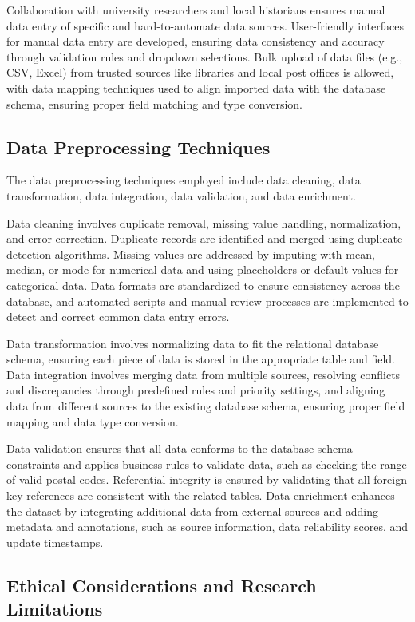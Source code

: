 Collaboration with university researchers and local historians ensures manual data entry of specific and hard-to-automate data sources. User-friendly interfaces for manual data entry are developed, ensuring data consistency and accuracy through validation rules and dropdown selections. Bulk upload of data files (e.g., CSV, Excel) from trusted sources like libraries and local post offices is allowed, with data mapping techniques used to align imported data with the database schema, ensuring proper field matching and type conversion.

\subsection{Data Preprocessing Techniques}

The data preprocessing techniques employed include data cleaning, data transformation, data integration, data validation, and data enrichment.

Data cleaning involves duplicate removal, missing value handling, normalization, and error correction. Duplicate records are identified and merged using duplicate detection algorithms. Missing values are addressed by imputing with mean, median, or mode for numerical data and using placeholders or default values for categorical data. Data formats are standardized to ensure consistency across the database, and automated scripts and manual review processes are implemented to detect and correct common data entry errors.

Data transformation involves normalizing data to fit the relational database schema, ensuring each piece of data is stored in the appropriate table and field.  Data integration involves merging data from multiple sources, resolving conflicts and discrepancies through predefined rules and priority settings, and aligning data from different sources to the existing database schema, ensuring proper field mapping and data type conversion.

Data validation ensures that all data conforms to the database schema constraints and applies business rules to validate data, such as checking the range of valid postal codes. Referential integrity is ensured by validating that all foreign key references are consistent with the related tables. Data enrichment enhances the dataset by integrating additional data from external sources and adding metadata and annotations, such as source information, data reliability scores, and update timestamps.


\subsection{Ethical Considerations and Research Limitations}

